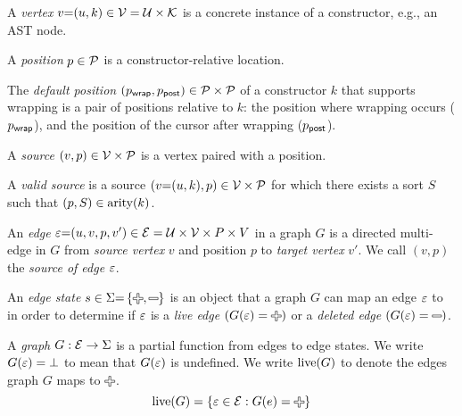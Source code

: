 \begin{definition}
  A \emph{vertex} $v{=}(u, k) \in \V = \U \times \K$ is a concrete instance of a constructor, e.g., an AST node.
\end{definition}

\begin{definition}
  A \emph{position} $p \in \P$ is a constructor-relative location.
\end{definition}

\begin{definition}
  The \emph{default position} $(\pWrap, \pPost) \in \P \times \P$ of a constructor $k$
  that supports wrapping is a pair of positions relative to $k$:
  the position where wrapping occurs ($\pWrap$),
  and the position of the cursor after wrapping ($\pPost$).
\end{definition}

\begin{definition}
  A \emph{source} $(v, p) \in \V \times \P$ is a vertex paired with a position.
\end{definition}

\begin{definition}
  A \emph{valid source} is a source $(v{=}(u, k), p) \in \V \times \P$
  for which there exists a sort $S$ such that $(p, S) \in \arity{k}$.
\end{definition}

\begin{definition}
  An \emph{edge} $\e{=}(u, v, p, v^\prime) \in \E = \U \times \V \times P \times V$ in a graph $G$
  is a directed multi-edge in $G$ from \emph{source vertex} $v$ and position $p$ to \emph{target vertex} $v'$.
  We call $(v, p)$ the \emph{source of edge} $\e$.
\end{definition}

\begin{definition}
  An \emph{edge state} $s \in \Sigma{=}\SetOf{\Plus, \Minus}$
  is an object that a graph $G$ can map an edge $\e$ to in order to determine if $\e$
  is a \emph{live edge} $\left(G(\e) = \Plus\right)$
  or a \emph{deleted edge} $\left(G(\e) = \Minus\right)$.
\end{definition}

\begin{definition}
  A \emph{graph} $G : \E \rightarrow \Sigma$ is a partial function from edges to edge states.
  We write $G(\e) = \bot$ to mean that $G(\e)$ is undefined.
  We write $\live{G}$ to denote the edges graph $G$ maps to $\Plus$.
  \[
    \live{G} = \SetOf{\e \in \E \SuchThat{G(e) = \Plus}}
  \]
\end{definition}


